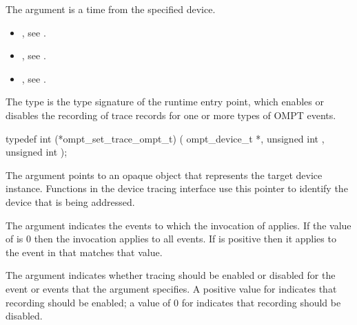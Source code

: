 The  argument is a time from the specified device.

\crossreferences
\begin{itemize}
\item {}, see .

\item {}, see .

\item {}, see .
\end{itemize}



\label{sec:ompt_set_trace_ompt_t}

\summary
The  type is the type signature of the 
 runtime entry point, which enables or disables 
the recording of trace records for one or more types of OMPT events.

\format
\begin{ccppspecific}
\begin{omptInquiry}
typedef int (*ompt_set_trace_ompt_t) (
  ompt_device_t *,
  unsigned int ,
  unsigned int 
);
\end{omptInquiry}
\end{ccppspecific}

\argdesc
The  argument points to an opaque object that represents
the target device instance. Functions in the device tracing interface
use this pointer to identify the device that is being addressed.

The  argument indicates the events to which the invocation of 
 applies. If the value of  is 0 then
the invocation applies to all events. If  is positive then it applies 
to the event in  that matches that value.

The  argument indicates whether tracing should be enabled 
or disabled for the event or events that the  argument specifies. 
A positive value for  indicates that recording should be enabled; 
a value of 0 for  indicates that recording should be disabled.

